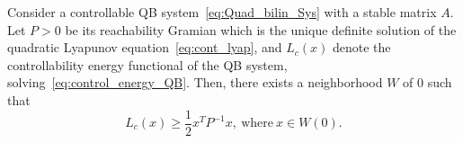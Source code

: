 \begin{theorem}\label{thm:con_bound}
Consider a controllable QB system~\eqref{eq:Quad_bilin_Sys}  with a stable matrix $A$. Let $P>0$ be  its reachability Gramian which is  the unique definite solution of the quadratic Lyapunov equation~\eqref{eq:cont_lyap}, and $L_c(x)$ denote the controllability energy functional of the QB system, solving~\eqref{eq:control_energy_QB}.  Then, there exists a neighborhood $W$ of $0$ such that
	  \begin{equation*}
	  L_c(x) \geq \dfrac{1}{2}x^T P^{-1}x, ~\mbox{where}~x\in W(0).
	  \end{equation*}
\end{theorem}
